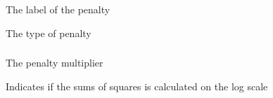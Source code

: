 
 {The label of the penalty}

 {The type of penalty}

\subsubsection[Process]{}

 {The penalty multiplier}

 {Indicates if the sums of squares is calculated on the log scale}

